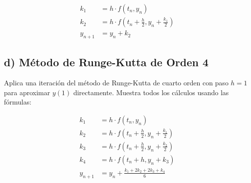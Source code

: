 \documentclass[12pt,a4paper]{article}
\begin{document}
\begin{align*}
k_1 &= h \cdot f(t_n, y_n) \\
k_2 &= h \cdot f\left(t_n + \frac{h}{2}, y_n + \frac{k_1}{2}\right) \\
y_{n+1} &= y_n + k_2
\end{align*}

\subsection*{d) Método de Runge-Kutta de Orden 4}
Aplica una iteración del método de Runge-Kutta de cuarto orden con paso \(h = 1\) para aproximar \(y(1)\) directamente. Muestra todos los cálculos usando las fórmulas:

\begin{align*}
k_1 &= h \cdot f(t_n, y_n) \\
k_2 &= h \cdot f\left(t_n + \frac{h}{2}, y_n + \frac{k_1}{2}\right) \\
k_3 &= h \cdot f\left(t_n + \frac{h}{2}, y_n + \frac{k_2}{2}\right) \\
k_4 &= h \cdot f(t_n + h, y_n + k_3) \\
y_{n+1} &= y_n + \frac{k_1 + 2k_2 + 2k_3 + k_4}{6}
\end{align*}
\end{document}
